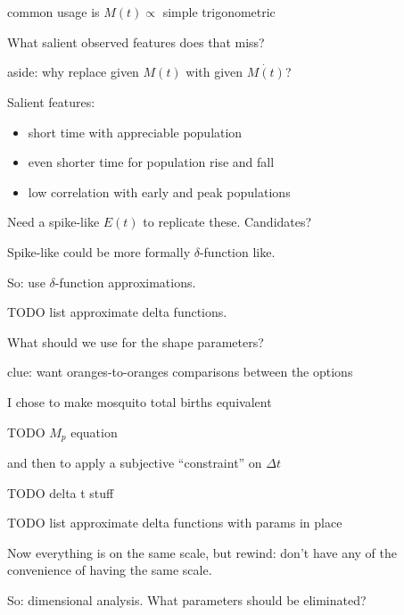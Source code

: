 \documentclass{seminar}
\begin{document}
\begin{slide}
common usage is $M(t)\propto$ simple trigonometric

What salient observed features does that miss?

aside: why replace given $M(t)$ with given $\dot{M(t)}$?
\end{slide}

\begin{slide}
Salient features:
\begin{itemize}
\item short time with appreciable population
\item even shorter time for population rise and fall
\item low correlation with early and peak populations %
\end{itemize}

Need a spike-like $E(t)$ to replicate these.  Candidates?
\end{slide}

\begin{slide}
Spike-like could be more formally $\delta$-function like.

So: use $\delta$-function approximations.
\end{slide}

\begin{slide}
TODO list approximate delta functions.
\end{slide}

\begin{slide}
What should we use for the shape parameters?

clue: want oranges-to-oranges comparisons between the options
\end{slide}

\begin{slide}
I chose to make mosquito total births equivalent

TODO $M_p$ equation

and then to apply a subjective ``constraint'' on $\Delta t$

TODO delta t stuff
\end{slide}

\begin{slide}
TODO list approximate delta functions with params in place
\end{slide}

\begin{slide}
Now everything is on the same scale, but rewind: don't have any of the convenience of having the same scale.

So: dimensional analysis.  What parameters should be eliminated?
\end{slide}
\end{document}
